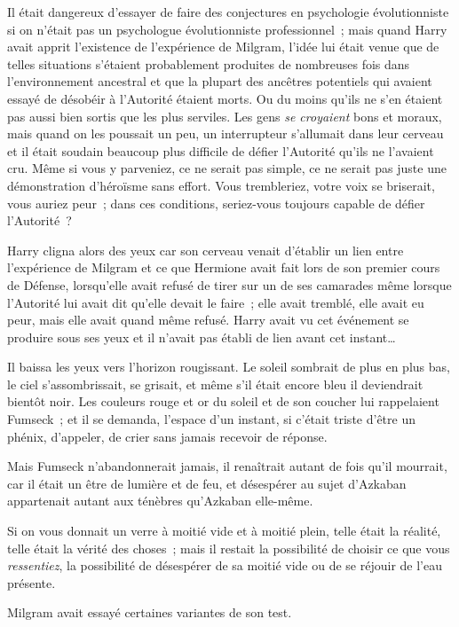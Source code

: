 Il était dangereux d'essayer de faire des conjectures en psychologie évolutionniste si on n'était pas un psychologue évolutionniste professionnel~; mais quand Harry avait apprit l'existence de l'expérience de Milgram, l'idée lui était venue que de telles situations s'étaient probablement produites de nombreuses fois dans l'environnement ancestral et que la plupart des ancêtres potentiels qui avaient essayé de désobéir à l'Autorité étaient morts. Ou du moins qu'ils ne s'en étaient pas aussi bien sortis que les plus serviles. Les gens \emph{se croyaient} bons et moraux, mais quand on les poussait un peu, un interrupteur s'allumait dans leur cerveau et il était soudain beaucoup plus difficile de défier l'Autorité qu'ils ne l'avaient cru. Même si vous y parveniez, ce ne serait pas simple, ce ne serait pas juste une démonstration d'héroïsme sans effort. Vous trembleriez, votre voix se briserait, vous auriez peur~; dans ces conditions, seriez-vous toujours capable de défier l'Autorité~?

Harry cligna alors des yeux car son cerveau venait d'établir un lien entre l'expérience de Milgram et ce que Hermione avait fait lors de son premier cours de Défense, lorsqu'elle avait refusé de tirer sur un de ses camarades même lorsque l'Autorité lui avait dit qu'elle devait le faire~; elle avait tremblé, elle avait eu peur, mais elle avait quand même refusé. Harry avait vu cet événement se produire sous ses yeux et il n'avait pas établi de lien avant cet instant…

Il baissa les yeux vers l'horizon rougissant. Le soleil sombrait de plus en plus bas, le ciel s'assombrissait, se grisait, et même s'il était encore bleu il deviendrait bientôt noir. Les couleurs rouge et or du soleil et de son coucher lui rappelaient Fumseck~; et il se demanda, l'espace d'un instant, si c'était triste d'être un phénix, d'appeler, de crier sans jamais recevoir de réponse.

Mais Fumseck n'abandonnerait jamais, il renaîtrait autant de fois qu'il mourrait, car il était un être de lumière et de feu, et désespérer au sujet d'Azkaban appartenait autant aux ténèbres qu'Azkaban elle-même.

Si on vous donnait un verre à moitié vide et à moitié plein, telle était la réalité, telle était la vérité des choses~; mais il restait la possibilité de choisir ce que vous \emph{ressentiez}, la possibilité de désespérer de sa moitié vide ou de se réjouir de l'eau présente.

Milgram avait essayé certaines variantes de son test.

